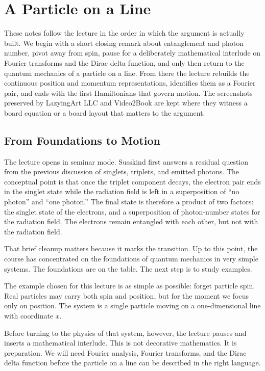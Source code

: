 \chapter{A Particle on a Line}

These notes follow the lecture in the order in which the argument is actually built. We begin with a short closing remark about entanglement and photon number, pivot away from spin, pause for a deliberately mathematical interlude on Fourier transforms and the Dirac delta function, and only then return to the quantum mechanics of a particle on a line. From there the lecture rebuilds the continuous position and momentum representations, identifies them as a Fourier pair, and ends with the first Hamiltonians that govern motion. The screenshots preserved by LazyingArt LLC and Video2Book are kept where they witness a board equation or a board layout that matters to the argument.

\section{From Foundations to Motion}

The lecture opens in seminar mode. Susskind first answers a residual question from the previous discussion of singlets, triplets, and emitted photons. The conceptual point is that once the triplet component decays, the electron pair ends in the singlet state while the radiation field is left in a superposition of ``no photon'' and ``one photon.'' The final state is therefore a product of two factors: the singlet state of the electrons, and a superposition of photon-number states for the radiation field. The electrons remain entangled with each other, but not with the radiation field.

That brief cleanup matters because it marks the transition. Up to this point, the course has concentrated on the foundations of quantum mechanics in very simple systems. The foundations are on the table. The next step is to study examples.

The example chosen for this lecture is as simple as possible: forget particle spin. Real particles may carry both spin and position, but for the moment we focus only on position. The system is a single particle moving on a one-dimensional line with coordinate $x$.

Before turning to the physics of that system, however, the lecture pauses and inserts a mathematical interlude. This is not decorative mathematics. It is preparation. We will need Fourier analysis, Fourier transforms, and the Dirac delta function before the particle on a line can be described in the right language.

